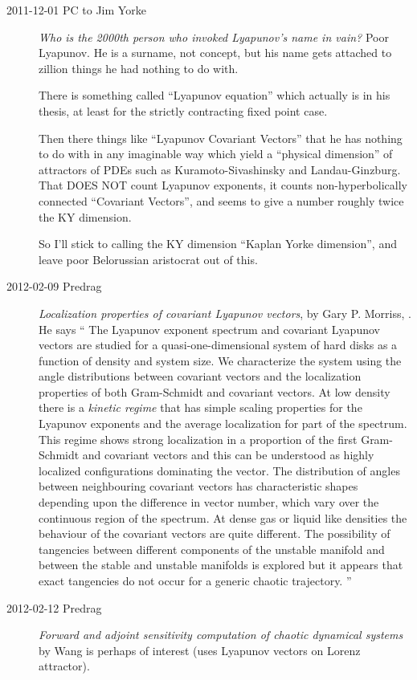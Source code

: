 \begin{description}
\item[2011-12-01 PC to Jim Yorke] \emph{Who is the 2000th person who
invoked Lyapunov's name in vain?} Poor Lyapunov. He is a surname, not
concept, but his name gets attached to zillion things he had nothing to
do with.

There is something called ``Lyapunov equation'' which actually is in his
thesis, at least for the strictly contracting fixed point case.

Then there things like ``Lyapunov Covariant Vectors'' that he has nothing
to do with in any imaginable way which yield a ``physical dimension'' of
attractors of PDEs such as Kuramoto-Sivashinsky and Landau-Ginzburg. That
DOES NOT count Lyapunov exponents, it counts non-hyperbolically connected
``Covariant Vectors'', and seems to give a number roughly twice the KY
dimension.

So I'll stick to calling the KY dimension  ``Kaplan Yorke dimension'', and
leave poor Belorussian aristocrat out of this.


\item[2012-02-09 Predrag]
{\em Localization properties of covariant {Lyapunov} vectors},
by Gary P. Morriss,
. He says
``
    The Lyapunov exponent spectrum and covariant Lyapunov vectors are studied for
a quasi-one-dimensional system of hard disks as a function of density and
system size. We characterize the system using the angle distributions between
covariant vectors and the localization properties of both Gram-Schmidt and
covariant vectors. At low density there is a {\it kinetic regime} that has
simple scaling properties for the Lyapunov exponents and the average
localization for part of the spectrum. This regime shows strong localization in
a proportion of the first Gram-Schmidt and covariant vectors and this can be
understood as highly localized configurations dominating the vector. The
distribution of angles between neighbouring covariant vectors has
characteristic shapes depending upon the difference in vector number, which
vary over the continuous region of the spectrum. At dense gas or liquid like
densities the behaviour of the covariant vectors are quite different. The
possibility of tangencies between different components of the unstable manifold
and between the stable and unstable manifolds is explored but it appears that
exact tangencies do not occur for a generic chaotic trajectory.
''

\item[2012-02-12 Predrag]
{\em Forward and adjoint sensitivity computation of chaotic dynamical
systems} by Wang is perhaps of interest (uses Lyapunov vectors
on Lorenz attractor).


\end{description}
